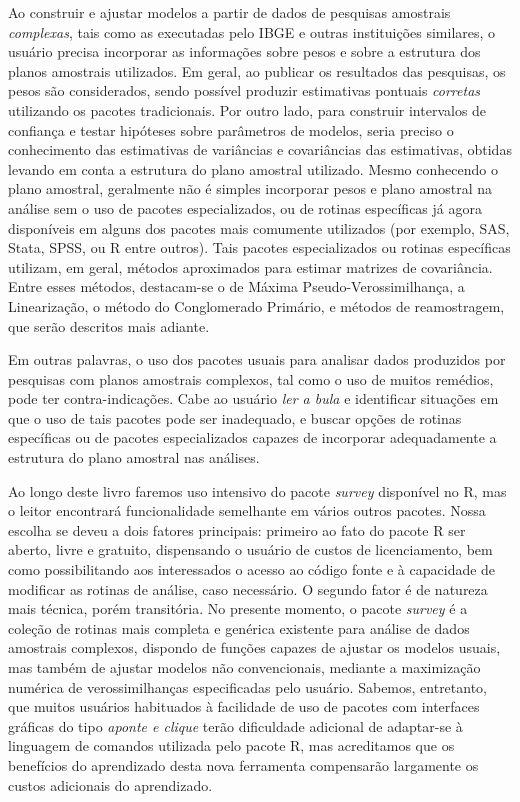 \documentclass[
  12pt,
  brazilian,
]{book}
\theoremstyle{definition}
\theoremstyle{definition}
\theoremstyle{definition}
\theoremstyle{definition}
\theoremstyle{remark}
\begin{document}
Ao construir e ajustar modelos a partir de dados de pesquisas amostrais
\emph{complexas}, tais como as executadas pelo IBGE e outras instituições similares,
o usuário precisa incorporar as informações sobre pesos e sobre a estrutura dos
planos amostrais utilizados. Em geral, ao publicar os resultados das pesquisas,
os pesos são considerados, sendo possível produzir estimativas pontuais
\emph{corretas} utilizando os pacotes tradicionais. Por outro lado, para construir
intervalos de confiança e testar hipóteses sobre parâmetros de modelos, seria
preciso o conhecimento das estimativas de variâncias e covariâncias das
estimativas, obtidas levando em conta a estrutura do plano amostral utilizado.
Mesmo conhecendo o plano amostral, geralmente não é simples incorporar pesos e
plano amostral na análise sem o uso de pacotes especializados, ou de rotinas
específicas já agora disponíveis em alguns dos pacotes mais comumente utilizados
(por exemplo, SAS, Stata, SPSS, ou R entre outros). Tais pacotes especializados
ou rotinas específicas utilizam, em geral, métodos aproximados para estimar
matrizes de covariância. Entre esses métodos, destacam-se o de Máxima
Pseudo-Verossimilhança, a Linearização, o método do Conglomerado Primário, e
métodos de reamostragem, que serão descritos mais adiante.

Em outras palavras, o uso dos pacotes usuais para analisar dados produzidos por
pesquisas com planos amostrais complexos, tal como o uso de muitos remédios,
pode ter contra-indicações. Cabe ao usuário \emph{ler a bula} e identificar situações
em que o uso de tais pacotes pode ser inadequado, e buscar opções de rotinas
específicas ou de pacotes especializados capazes de incorporar adequadamente a
estrutura do plano amostral nas análises.

Ao longo deste livro faremos uso intensivo do pacote \emph{survey} disponível no R,
mas o leitor encontrará funcionalidade semelhante em vários outros pacotes.
Nossa escolha se deveu a dois fatores principais: primeiro ao fato do pacote R
ser aberto, livre e gratuito, dispensando o usuário de custos de licenciamento,
bem como possibilitando aos interessados o acesso ao código fonte e à capacidade
de modificar as rotinas de análise, caso necessário. O segundo fator é de
natureza mais técnica, porém transitória. No presente momento, o pacote \emph{survey}
é a coleção de rotinas mais completa e genérica existente para análise de dados
amostrais complexos, dispondo de funções capazes de ajustar os modelos usuais,
mas também de ajustar modelos não convencionais, mediante a maximização numérica
de verossimilhanças especificadas pelo usuário. Sabemos, entretanto, que muitos
usuários habituados à facilidade de uso de pacotes com interfaces gráficas do
tipo \emph{aponte e clique} terão dificuldade adicional de adaptar-se à linguagem de
comandos utilizada pelo pacote R, mas acreditamos que os benefícios do
aprendizado desta nova ferramenta compensarão largamente os custos adicionais do
aprendizado.
\end{document}
